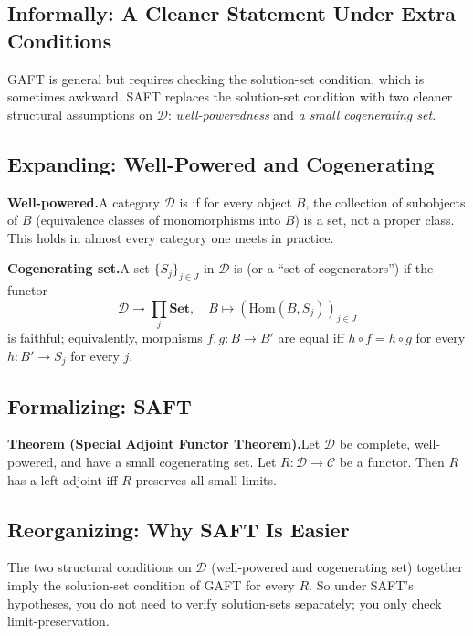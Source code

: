 \subsection{Informally: A Cleaner Statement Under Extra Conditions}

GAFT is general but requires checking the solution-set condition, which
is sometimes awkward. SAFT replaces the solution-set condition with two
cleaner structural assumptions on $\mathcal{D}$: \emph{well-poweredness}
and \emph{a small cogenerating set}.

\subsection{Expanding: Well-Powered and Cogenerating}

\textbf{Well-powered.}\quad A category $\mathcal{D}$ is
 if for every object $B$, the collection of
subobjects of $B$ (equivalence classes of monomorphisms into $B$) is a
set, not a proper class. This holds in almost every category one meets
in practice.

\textbf{Cogenerating set.}\quad A set $\{S_j\}_{j \in J}$ in $\mathcal{D}$
is  (or a ``set of cogenerators'') if the functor
\begin{equation*}
  \mathcal{D} \to \prod_j \mathbf{Set},
  \quad
  B \mapsto (\mathrm{Hom}(B, S_j))_{j \in J}
\end{equation*}
is faithful; equivalently, morphisms $f, g : B \to B'$ are equal iff
$h \circ f = h \circ g$ for every $h : B' \to S_j$ for every $j$.

\subsection{Formalizing: SAFT}

\textbf{Theorem (Special Adjoint Functor Theorem).}\quad Let
$\mathcal{D}$ be complete, well-powered, and have a small cogenerating
set. Let $R : \mathcal{D} \to \mathcal{C}$ be a functor. Then $R$ has a
left adjoint iff $R$ preserves all small limits.

\subsection{Reorganizing: Why SAFT Is Easier}

The two structural conditions on $\mathcal{D}$ (well-powered and
cogenerating set) together imply the solution-set condition of GAFT for
every $R$. So under SAFT's hypotheses, you do not need to verify
solution-sets separately; you only check limit-preservation.


